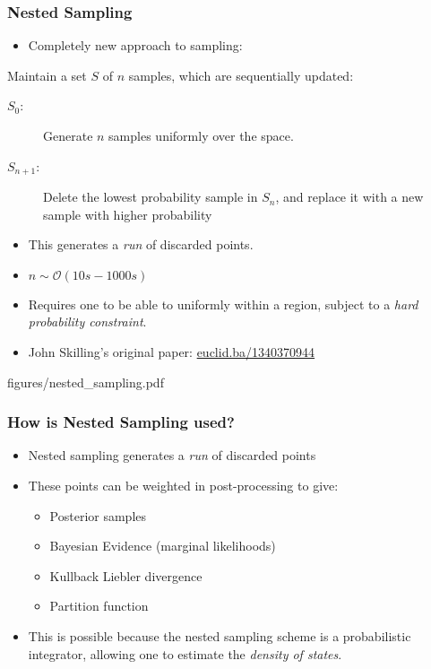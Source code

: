 \documentclass[%
    handout
]{beamer}
\begin{document}
\begin{frame}
  \frametitle{Nested Sampling} 
  \begin{itemize}
      \item Completely new approach to sampling:
  \end{itemize}

  Maintain a set $S$ of $n$ samples, which are sequentially updated:

  \begin{description}
    \item[$S_0$:] Generate $n$ samples uniformly over the space.
    \item[$S_{n+1}$:] Delete the lowest probability sample in $S_{n}$, and replace it with a new sample with higher probability
  \end{description}

  \begin{itemize}
      \item This generates a \emph{run} of discarded points.
      \item $n\sim\mathcal{O}(10s-1000s)$
      \item Requires one to be able to uniformly within a region, subject to a {\em hard probability constraint}.
      \item John Skilling's original paper: \href{https://projecteuclid.org/euclid.ba/1340370944}{euclid.ba/1340370944}
  \end{itemize}
\end{frame}

\begin{multifig}{figures/nested_sampling.pdf}
\end{multifig}

\begin{frame}
  \frametitle{How is Nested Sampling used?} 
  \begin{itemize}
      \item Nested sampling generates a \emph{run} of discarded points
      \item These points can be weighted in post-processing to give:
          \begin{itemize}
              \item Posterior samples
              \item Bayesian Evidence (marginal likelihoods)
              \item Kullback Liebler divergence
              \item Partition function
          \end{itemize}
      \item This is possible because the nested sampling scheme is a probabilistic integrator, allowing one to estimate the \emph{density of states}.
  \end{itemize}
\end{frame}
\end{document}
